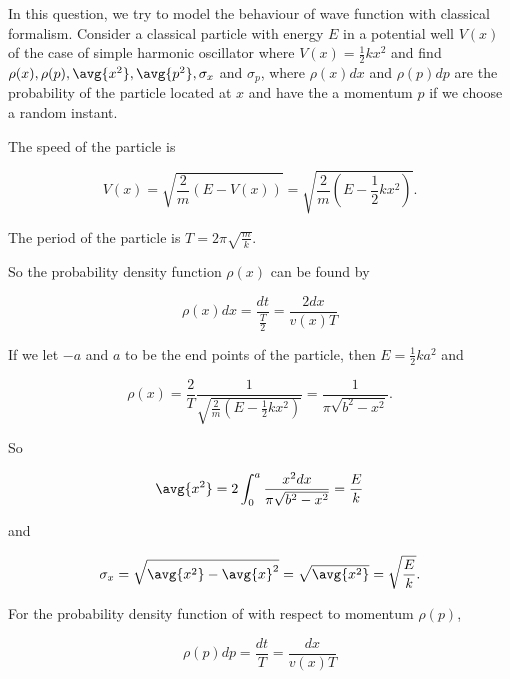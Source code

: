 \documentclass[a4paper,12pt]{report}
\begin{document}
{In this question, we try to model the behaviour of wave function with classical formalism. Consider a classical particle with energy \(E\) in a potential well \(V(x)\) of the case of simple harmonic oscillator where \(V(x) = \frac12 kx^2\) and find \(\rho(x),\rho(p), \avg{x^2}, \avg{p^2}, \sigma_x\) and \(\sigma_p\), where \(\rho(x)dx\) and \(\rho(p)dp\) are the probability of the particle located at \(x\) and have the a momentum \(p\) if we choose a random instant.}
{The speed of the particle is
	
\begin{equation}
  V(x) = \sqrt{\frac{2}{m} (E - V(x))} = \sqrt{\frac{2}{m} (E - \frac{1}{2} kx^2 )}.  
\end{equation}
		
The period of the particle is  \(T = 2\pi \sqrt{\frac{m}{k}}\).
		
So the probability density function \(\rho(x)\) can be found by
		
\begin{equation}
  \rho (x) dx = \frac{dt}{\frac{T}{2} } = \frac{2dx}{v(x)T}  
\end{equation}
		
If we let \(-a\) and \(a\) to be the end points of the particle, then \(E = \frac{1}{2}  ka^2\) and
		
\begin{equation}
  \rho (x) = \frac{2}{T} \frac{1}{\sqrt{\frac{2}{m} (E - \frac{1}{2} kx^2 )} } = \frac{1}{\pi \sqrt{b^2 -x^2 } }.  
\end{equation}

So 
		
\begin{equation}
  \avg{x^2 } = 2\int_{0}^{a} \frac{x^2 dx}{\pi \sqrt{b^2 -x^2 } } =  \frac{E}{k}    
\end{equation}

and 

\begin{equation}
  \sigma _{x} = \sqrt{\avg{x^2 } - \avg{x} ^2  } = \sqrt{\avg{x^2 } } = \sqrt{\frac{E}{k} }.   
\end{equation}

For the probability density function of with respect to momentum \(\rho(p)\), 

\begin{equation}
  \rho (p)dp = \frac{dt}{T}  = \frac{dx}{v(x)T}  
\end{equation}}

	
	









	
\end{document}
